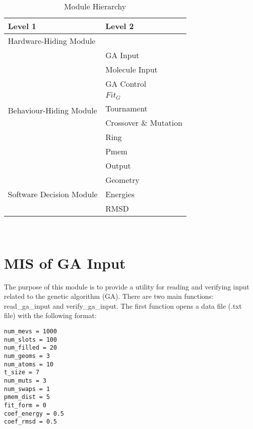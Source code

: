 \documentclass[12pt, titlepage]{article}
\begin{document}
\begin{table}[h!]
	\centering
	\begin{tabular}{p{} p{}}
		\toprule
		\textbf{Level 1} & \textbf{Level 2}\\
		\midrule
		
		{Hardware-Hiding Module} & ~ \\
		\midrule
		
		\multirow{9}{0.3\textwidth}{Behaviour-Hiding Module}& GA Input \\
		& Molecule Input \\
		& GA Control\\
		& $Fit_G$ \\
		& Tournament \\
		& Crossover \& Mutation \\
		& Ring \\
		& Pmem \\
		& Output \\
		
		\midrule
		
		\multirow{3}{0.3\textwidth}{Software Decision Module} & Geometry \\
		& Energies \\
		& RMSD \\
		\bottomrule
		
	\end{tabular}
	\caption{Module Hierarchy}
	\label{TblMH}
\end{table}

\newpage
~\newpage

\section{MIS of GA Input} \label{section-ga_input}



The purpose of this module is to provide a utility for reading and verifying 
input related to the genetic algorithm (GA). There are two main functions: 
read\_ga\_input and verify\_ga\_input. The first function opens a data file 
(.txt file) with the following format:

\begin{lstlisting}
num_mevs = 1000
num_slots = 100
num_filled = 20
num_geoms = 3
num_atoms = 10
t_size = 7
num_muts = 3
num_swaps = 1
pmem_dist = 5
fit_form = 0
coef_energy = 0.5
coef_rmsd = 0.5
\end{lstlisting}
\end{document}
